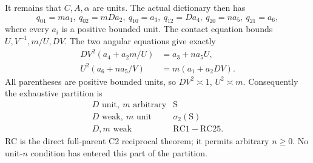 It remains that \(C,A,\alpha\) are units.
The actual dictionary then has
\[
 q_{01}=ma_1,\ q_{02}=mDa_2,\ q_{10}=a_3,\
 q_{12}=Da_4,\ q_{20}=na_5,\ q_{21}=a_6 ,
\]
where every \(a_i\) is a positive bounded unit.
The contact equation bounds \(U,V^{-1},m/U,DV\).
The two angular equations give exactly
\[
 \begin{split}
 DV^2(a_4+a_2m/U)&=a_3+na_5U,\\
 U^2(a_6+na_5/V)&=m(a_1+a_2DV).
 \end{split}
\]
All parentheses are positive bounded units, so
\(DV^2\asymp1\), \(U^2\asymp m\).
Consequently the exhaustive partition is
\[
\begin{array}{c|c}
 D\text{ unit},\ m\text{ arbitrary}&\mathrm S\\
 D\text{ weak},\ m\text{ unit}&\sigma_2(\mathrm S)\\
 D,m\text{ weak}&\mathrm{RC1\!-\!RC25}.
\end{array}\tag{AU16}
\]
RC is the direct full-parent C2 reciprocal theorem; it permits
arbitrary \(n\geq0\). No unit-\(n\) condition has entered this
part of the partition.

